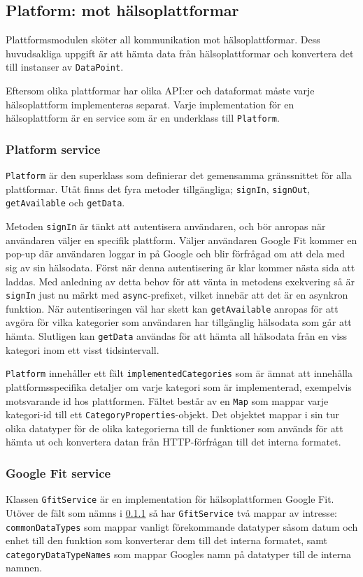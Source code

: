 \documentclass[techdoc/techdoc.tex]{subfiles}
\begin{document}
\subsection{Platform: mot hälsoplattformar} \label{sec:platform}
Plattformsmodulen sköter all kommunikation mot hälsoplattformar. Dess
huvudsakliga uppgift är att hämta data från hälsoplattformar och konvertera det
till instanser av \texttt{DataPoint}.

Eftersom olika plattformar har olika API:er och dataformat måste varje
hälsoplattform implementeras separat. Varje implementation för en
hälsoplattform är en service som är en underklass till \texttt{Platform}.

\subsubsection{Platform service} \label{sec:sys-platform}
\texttt{Platform} är den superklass som definierar det gemensamma gränssnittet
för alla plattformar. Utåt finns det fyra metoder tillgängliga;
\texttt{signIn}, \texttt{signOut}, \texttt{getAvailable} och \texttt{getData}.

Metoden \texttt{signIn} är tänkt att autentisera användaren, och bör anropas
när användaren väljer en specifik plattform. Väljer användaren Google Fit
kommer en pop-up där användaren loggar in på Google och blir förfrågad om att
dela med sig av sin hälsodata. Först när denna autentisering är klar kommer
nästa sida att laddas. Med anledning av detta behov för att vänta in metodens
exekvering så är \texttt{signIn} just nu märkt med \texttt{async}-prefixet,
vilket innebär att det är en asynkron funktion.
När autentiseringen väl har skett kan \texttt{getAvailable} anropas för att
avgöra för vilka kategorier som användaren har tillgänglig hälsodata som går
att hämta. Slutligen kan \texttt{getData} användas för att hämta all hälsodata
från en viss kategori inom ett visst tidsintervall.

\texttt{Platform} innehåller ett fält \texttt{implementedCategories} som är
ämnat att innehålla plattformsspecifika detaljer om varje kategori som är
implementerad, exempelvis motsvarande id hos plattformen. Fältet består av en
\texttt{Map} som mappar varje kategori-id till ett
\texttt{CategoryProperties}-objekt. Det objektet mappar i sin tur olika
datatyper för de olika kategorierna till de funktioner som används för att
hämta ut och konvertera datan från HTTP-förfrågan till det interna formatet.

\subsubsection{Google Fit service}
Klassen \texttt{GfitService} är en implementation för hälsoplattformen Google
Fit. Utöver de fält som nämns i \ref{sec:sys-platform} så har
\texttt{GfitService} två mappar av intresse: \texttt{commonDataTypes} som
mappar vanligt förekommande datatyper såsom datum och enhet till den funktion
som konverterar dem till det interna formatet, samt
\texttt{categoryDataTypeNames} som mappar Googles namn på datatyper till de
interna namnen.
\end{document}
